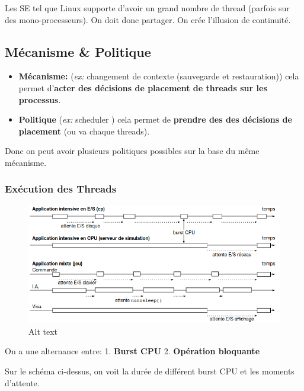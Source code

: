 Les SE tel que Linux supporte d'avoir un grand nombre de thread (parfois
sur des mono-processeurs). On doit donc partager. On crée l'illusion de
continuité.

\subsection{Mécanisme \& Politique}\label{muxe9canisme-politique}

\begin{itemize}
\tightlist
\item
  \textbf{Mécanisme:} (\emph{ex:} changement de contexte (sauvegarde et
  restauration)) cela permet d'\textbf{acter des décisions de placement
  de threads sur les processus}.
\item
  \textbf{Politique} (\emph{ex:} scheduler ) cela permet de
  \textbf{prendre des des décisions de placement} (ou va chaque
  threads).
\end{itemize}

Donc on peut avoir plusieurs politiques possibles sur la base du même
mécanisme.

\subsubsection{Exécution des Threads}\label{exuxe9cution-des-threads}

\begin{figure}
\centering
\includegraphics{image-28.png}
\caption{Alt text}
\end{figure}

On a une alternance entre: 1. \textbf{Burst CPU} 2. \textbf{Opération
bloquante}

Sur le schéma ci-dessus, on voit la durée de différent burst CPU et les
moments d'attente.

